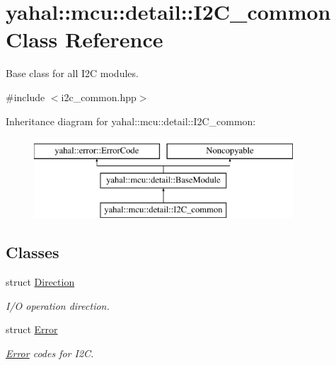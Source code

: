 \hypertarget{classyahal_1_1mcu_1_1detail_1_1_i2_c__common}{}\section{yahal\+:\+:mcu\+:\+:detail\+:\+:I2\+C\+\_\+common Class Reference}
\label{classyahal_1_1mcu_1_1detail_1_1_i2_c__common}


Base class for all I2\+C modules.  




{\ttfamily \#include $<$i2c\+\_\+common.\+hpp$>$}

Inheritance diagram for yahal\+:\+:mcu\+:\+:detail\+:\+:I2\+C\+\_\+common\+:\begin{figure}[H]
\begin{center}
\leavevmode
\includegraphics[height=3.000000cm]{classyahal_1_1mcu_1_1detail_1_1_i2_c__common}
\end{center}
\end{figure}
\subsection*{Classes}
\begin{DoxyCompactItemize}
\item 
struct \hyperlink{structyahal_1_1mcu_1_1detail_1_1_i2_c__common_1_1_direction}{Direction}
\begin{DoxyCompactList}\small\item\em I/\+O operation direction. \end{DoxyCompactList}\item 
struct \hyperlink{structyahal_1_1mcu_1_1detail_1_1_i2_c__common_1_1_error}{Error}
\begin{DoxyCompactList}\small\item\em \hyperlink{structyahal_1_1mcu_1_1detail_1_1_i2_c__common_1_1_error}{Error} codes for I2\+C. \end{DoxyCompactList}\end{DoxyCompactItemize}
